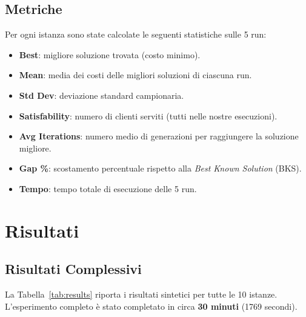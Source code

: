 \documentclass[a4paper,12pt]{article}
\begin{document}
\subsection{Metriche}

Per ogni istanza sono state calcolate le seguenti statistiche sulle 5 run:

\begin{itemize}[leftmargin=*]
    \item \textbf{Best}: migliore soluzione trovata (costo minimo).
    \item \textbf{Mean}: media dei costi delle migliori soluzioni di ciascuna run.
    \item \textbf{Std Dev}: deviazione standard campionaria.
    \item \textbf{Satisfability}: numero di clienti serviti (tutti nelle nostre esecuzioni).
    \item \textbf{Avg Iterations}: numero medio di generazioni per raggiungere la soluzione migliore.
    \item \textbf{Gap \%}: scostamento percentuale rispetto alla \emph{Best Known Solution} (BKS).
    \item \textbf{Tempo}: tempo totale di esecuzione delle 5 run.
\end{itemize}


\section{Risultati}

\subsection{Risultati Complessivi}

La Tabella~\ref{tab:results} riporta i risultati sintetici per tutte le 10 istanze. L'esperimento completo è stato completato in circa \textbf{30 minuti} (1769 secondi).
\end{document}
